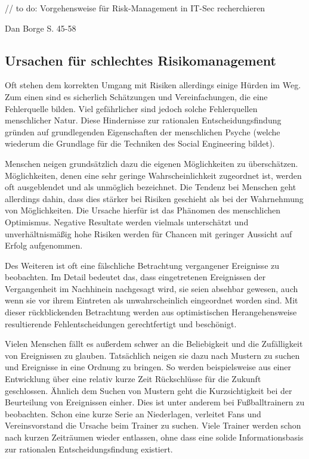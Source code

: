 // to do: Vorgehensweise für Risk-Management in IT-Sec recherchieren

Dan Borge S. 45-58

\subsection{Ursachen für schlechtes Risikomanagement}\label{sec:ursachen}
Oft stehen dem korrekten Umgang mit Risiken allerdings einige Hürden im Weg. Zum einen sind es sicherlich Schätzungen und Vereinfachungen, die eine Fehlerquelle bilden. Viel gefährlicher sind jedoch solche Fehlerquellen menschlicher Natur. Diese Hindernisse zur rationalen Entscheidungsfindung gründen auf grundlegenden Eigenschaften der menschlichen Psyche (welche wiederum die Grundlage für die Techniken des Social Engineering bildet).

Menschen neigen grundsätzlich dazu die eigenen Möglichkeiten zu überschätzen.
Möglichkeiten, denen eine sehr geringe Wahrscheinlichkeit zugeordnet ist, werden oft ausgeblendet und
als unmöglich bezeichnet.
Die Tendenz bei Menschen geht allerdings dahin, dass dies stärker bei Risiken geschieht als bei der
Wahrnehmung von Möglichkeiten.
Die Ursache hierfür ist das Phänomen des menschlichen Optimismus.
Negative Resultate werden vielmals unterschätzt und unverhältnismäßig hohe Risiken werden für Chancen
mit geringer Aussicht auf Erfolg aufgenommen.

Des Weiteren ist oft eine fälschliche Betrachtung vergangener Ereignisse zu beobachten.
Im Detail bedeutet das, dass eingetretenen Ereignissen der Vergangenheit im Nachhinein nachgesagt
wird, sie seien absehbar gewesen, auch wenn sie vor ihrem Eintreten als unwahrscheinlich eingeordnet
worden sind.
Mit dieser rückblickenden Betrachtung werden aus optimistischen Herangehensweise resultierende
Fehlentscheidungen gerechtfertigt und beschönigt.

Vielen Menschen fällt es außerdem schwer an die Beliebigkeit und die Zufälligkeit von Ereignissen zu
glauben.
Tatsächlich neigen sie dazu nach Mustern zu suchen und Ereignisse in eine Ordnung zu bringen.
So werden beispielsweise aus einer Entwicklung über eine relativ kurze Zeit Rückschlüsse für die Zukunft geschlossen.
Ähnlich dem Suchen von Mustern geht die Kurzsichtigkeit bei der Beurteilung von Ereignissen einher.
Dies ist unter anderem bei Fußballtrainern zu beobachten.
Schon eine kurze Serie an Niederlagen, verleitet Fans und Vereinsvorstand die Ursache beim Trainer zu
suchen.
Viele Trainer werden schon nach kurzen Zeiträumen wieder entlassen, ohne dass eine solide
Informationsbasis zur rationalen Entscheidungsfindung existiert.

